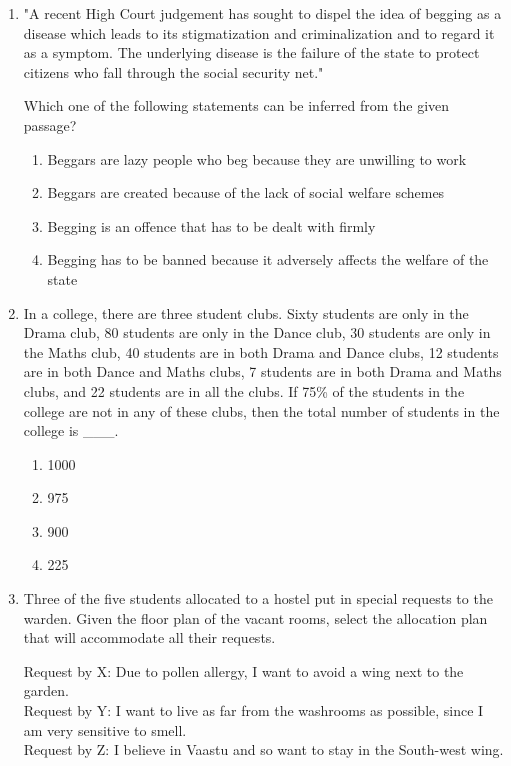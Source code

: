 \documentclass[12pt]{article}
\begin{document}
\begin{enumerate}[label=\textbf{Q.\arabic*}., start=6, leftmargin=*]
\item "A recent High Court judgement has sought to dispel the idea of begging as a disease which leads to its stigmatization and criminalization and to regard it as a symptom. The underlying disease is the failure of the state to protect citizens who fall through the social security net."

Which one of the following statements can be inferred from the given passage?
\begin{enumerate}[label=(\Alph*)]
\item Beggars are lazy people who beg because they are unwilling to work
\item Beggars are created because of the lack of social welfare schemes
\item Begging is an offence that has to be dealt with firmly
\item Begging has to be banned because it adversely affects the welfare of the state
\end{enumerate}
\item In a college, there are three student clubs. Sixty students are only in the Drama club, 80 students are only in the Dance club, 30 students are only in the Maths club, 40 students are in both Drama and Dance clubs, 12 students are in both Dance and Maths clubs, 7 students are in both Drama and Maths clubs, and 22 students are in all the clubs. If 75\% of the students in the college are not in any of these clubs, then the total number of students in the college is \_\_\_.
\begin{multicols}{2}
\begin{enumerate}[label=(\Alph*)]
\item 1000
\item 975
\item 900
\item 225
\end{enumerate}
\end{multicols}

\item Three of the five students allocated to a hostel put in special requests to the warden. Given the floor plan of the vacant rooms, select the allocation plan that will accommodate all their requests.

Request by X: Due to pollen allergy, I want to avoid a wing next to the garden.\\
Request by Y: I want to live as far from the washrooms as possible, since I am very sensitive to smell.\\
Request by Z: I believe in Vaastu and so want to stay in the South-west wing.


\end{enumerate}
\end{document}
